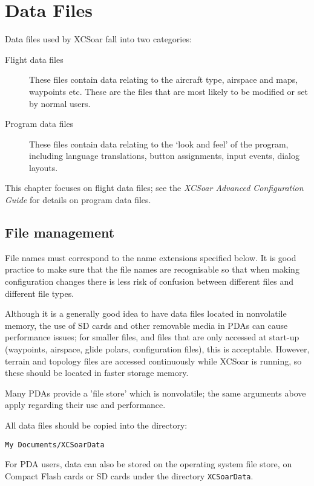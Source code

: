 \chapter{Data Files}\label{cha:data-files}

Data files used by XCSoar fall into two categories:
\begin{description}
\item[Flight data files]  These files contain data relating to
the aircraft type, airspace and maps, waypoints etc.  These are the
files that are most likely to be modified or set by normal users.
\item[Program data files]  These files contain data relating to
the `look and feel' of the program, including language translations, 
button assignments, input events, dialog layouts.
\end{description}
This chapter focuses on flight data files; see the {\em XCSoar
Advanced Configuration Guide} for details on program data files.

\section{File management}

File names must correspond to the name extensions specified below.  It
is good practice to make sure that the file names are recognisable so
that when making configuration changes there is less risk of confusion
between different files and different file types.

Although it is a generally good idea to have data files located in
nonvolatile memory, the use of SD cards and other removable media in
PDAs can cause performance issues; for smaller files, and files that
are only accessed at start-up (waypoints, airspace, glide polars,
configuration files), this is acceptable.  However, terrain and
topology files are accessed continuously while XCSoar is running, so
these should be located in faster storage memory.

Many PDAs provide a 'file store' which is nonvolatile; the same
arguments above apply regarding their use and performance.

All data files should be copied into the directory:
\begin{verbatim}
My Documents/XCSoarData
\end{verbatim}

For PDA users, data can also be stored on the operating system file
store, on Compact Flash cards or SD cards under the directory
\verb|XCSoarData|.

